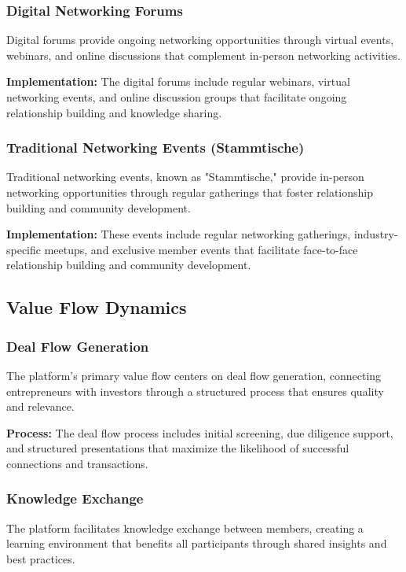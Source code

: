 \subsubsection{Digital Networking Forums}
Digital forums provide ongoing networking opportunities through virtual events, webinars, and online discussions that complement in-person networking activities.

\textbf{Implementation:} The digital forums include regular webinars, virtual networking events, and online discussion groups that facilitate ongoing relationship building and knowledge sharing.

\subsubsection{Traditional Networking Events (Stammtische)}
Traditional networking events, known as "Stammtische," provide in-person networking opportunities through regular gatherings that foster relationship building and community development.

\textbf{Implementation:} These events include regular networking gatherings, industry-specific meetups, and exclusive member events that facilitate face-to-face relationship building and community development.

\subsection{Value Flow Dynamics}

\subsubsection{Deal Flow Generation}
The platform's primary value flow centers on deal flow generation, connecting entrepreneurs with investors through a structured process that ensures quality and relevance.

\textbf{Process:} The deal flow process includes initial screening, due diligence support, and structured presentations that maximize the likelihood of successful connections and transactions.

\subsubsection{Knowledge Exchange}
The platform facilitates knowledge exchange between members, creating a learning environment that benefits all participants through shared insights and best practices.

